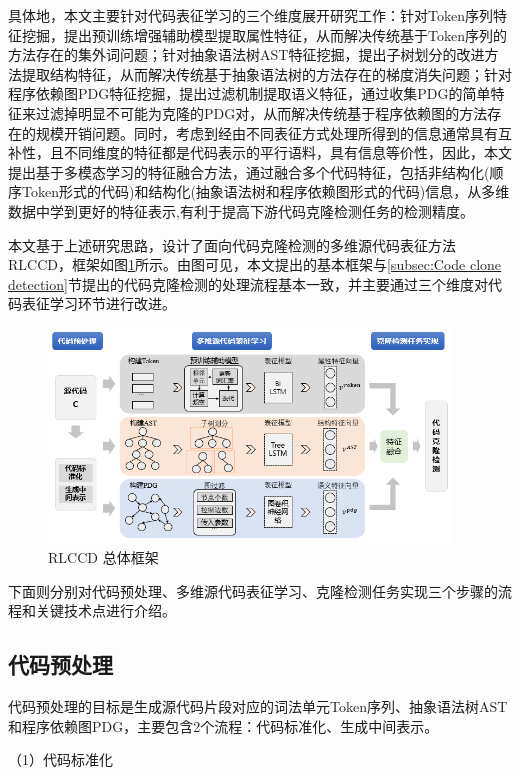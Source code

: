具体地，本文主要针对代码表征学习的三个维度展开研究工作：针对Token序列特征挖掘，提出预训练增强辅助模型提取属性特征，从而解决传统基于Token序列的方法存在的集外词问题；针对抽象语法树AST特征挖掘，提出子树划分的改进方法提取结构特征，从而解决传统基于抽象语法树的方法存在的梯度消失问题；针对程序依赖图PDG特征挖掘，提出过滤机制提取语义特征，通过收集PDG的简单特征来过滤掉明显不可能为克隆的PDG对，从而解决传统基于程序依赖图的方法存在的规模开销问题。同时，考虑到经由不同表征方式处理所得到的信息通常具有互补性，且不同维度的特征都是代码表示的平行语料，具有信息等价性，因此，本文提出基于多模态学习的特征融合方法，通过融合多个代码特征，包括非结构化(顺序Token形式的代码)和结构化(抽象语法树和程序依赖图形式的代码)信息，从多维数据中学到更好的特征表示,有利于提高下游代码克隆检测任务的检测精度。

本文基于上述研究思路，设计了面向代码克隆检测的多维源代码表征方法RLCCD，框架如图\ref{fig:framework}所示。由图可见，本文提出的基本框架与\ref{subsec:Code clone detection}节提出的代码克隆检测的处理流程基本一致，并主要通过三个维度对代码表征学习环节进行改进。

\begin{figure}[H]
    \centering
    \includegraphics[width=0.95\textwidth]{figures/framework}
    \caption{RLCCD 总体框架}
    \label{fig:framework}
\end{figure}

下面则分别对代码预处理、多维源代码表征学习、克隆检测任务实现三个步骤的流程和关键技术点进行介绍。

\subsection{代码预处理}
\label{subsec:Preprocess}
代码预处理的目标是生成源代码片段对应的词法单元Token序列、抽象语法树AST和程序依赖图PDG，主要包含2个流程：代码标准化、生成中间表示。

（1）代码标准化

